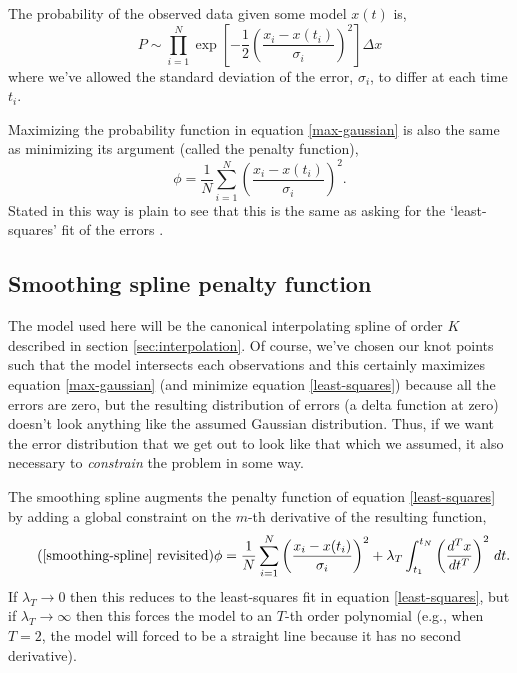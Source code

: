 \documentclass[10pt,journal]{IEEEtran}
\begin{document}
The probability of the observed data given some model $x(t)$ is,
\begin{equation}
\label{max-gaussian}
P \sim \prod_{i=1}^{N}  \exp \left[ -\frac{1}{2} \left( \frac{x_i - x(t_i)}{\sigma_i} \right)^2 \right] \Delta x
\end{equation}
where we've allowed the standard deviation of the error, $\sigma_i$, to differ at each time $t_i$.

Maximizing the probability function in equation \ref{max-gaussian} is also the same as minimizing its argument (called the penalty function),
\begin{equation}
\label{least-squares}
\phi = \frac{1}{N}\sum_{i=1}^{N} \left( \frac{x_i - x(t_i)}{\sigma_i} \right)^2 .
\end{equation}
Stated in this way is plain to see that this is the same as asking for the `least-squares' fit of the errors \cite{press1992-book}.


\subsection{Smoothing spline penalty function}

The model used here will be the canonical interpolating spline of order $K$ described in section \ref{sec:interpolation}. Of course, we've chosen our knot points such that the model intersects each observations and this certainly maximizes equation \ref{max-gaussian} (and minimize equation \ref{least-squares}) because all the errors are zero, but the resulting distribution of errors (a delta function at zero) doesn't look anything like the assumed Gaussian distribution. Thus, if we want the error distribution that we get out to look like that which we assumed, it also necessary to \emph{constrain} the problem in some way.

The smoothing spline augments the penalty function of equation \ref{least-squares} by adding a global constraint on the $m$-th derivative of the resulting function,
\begin{equation*}
\tag{\ref{smoothing-spline} revisited}
\phi =  \frac{1}{N}\sum_{i=1}^{N} \left( \frac{x_i - x(t_i)}{\sigma_i} \right) ^2 + \lambda_T \int_{t_1}^{t_N} \left(\frac{d^T x}{dt^T}\right)^2 \, dt.
\end{equation*}
If $\lambda_T \rightarrow 0$ then this reduces to the least-squares fit in equation \ref{least-squares}, but if $\lambda_T \rightarrow \infty$ then this forces the model to an $T$-th order polynomial (e.g., when $T=2$, the model will forced to be a straight line because it has no second derivative).
\end{document}
